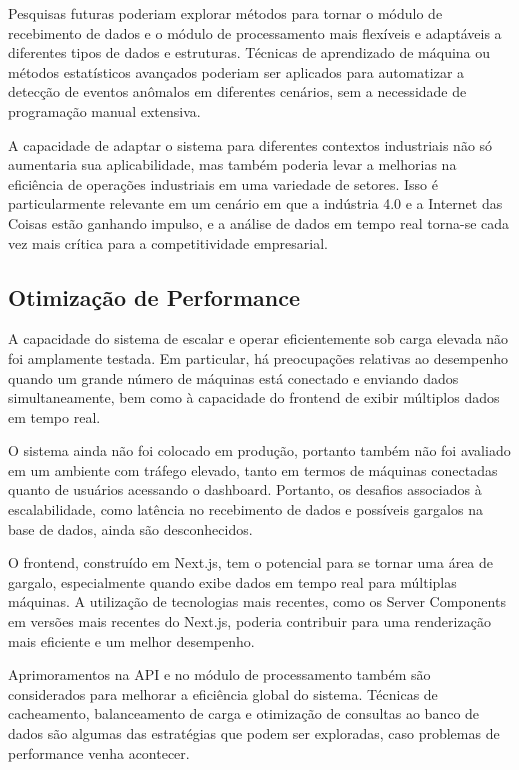 Pesquisas futuras poderiam explorar métodos para tornar o módulo de recebimento de dados e o módulo de processamento mais flexíveis e adaptáveis a diferentes tipos de dados e estruturas. Técnicas de aprendizado de máquina ou métodos estatísticos avançados poderiam ser aplicados para automatizar a detecção de eventos anômalos em diferentes cenários, sem a necessidade de programação manual extensiva.

A capacidade de adaptar o sistema para diferentes contextos industriais não só aumentaria sua aplicabilidade, mas também poderia levar a melhorias na eficiência de operações industriais em uma variedade de setores. Isso é particularmente relevante em um cenário em que a indústria 4.0 e a Internet das Coisas estão ganhando impulso, e a análise de dados em tempo real torna-se cada vez mais crítica para a competitividade empresarial.

\subsection{Otimização de Performance}

A capacidade do sistema de escalar e operar eficientemente sob carga elevada não foi amplamente testada. Em particular, há preocupações relativas ao desempenho quando um grande número de máquinas está conectado e enviando dados simultaneamente, bem como à capacidade do frontend de exibir múltiplos dados em tempo real.

O sistema ainda não foi colocado em produção, portanto também não foi avaliado em um ambiente com tráfego elevado, tanto em termos de máquinas conectadas quanto de usuários acessando o dashboard. Portanto, os desafios associados à escalabilidade, como latência no recebimento de dados e possíveis gargalos na base de dados, ainda são desconhecidos.

O frontend, construído em Next.js, tem o potencial para se tornar uma área de gargalo, especialmente quando exibe dados em tempo real para múltiplas máquinas. A utilização de tecnologias mais recentes, como os Server Components em versões mais recentes do Next.js, poderia contribuir para uma renderização mais eficiente e um melhor desempenho.

Aprimoramentos na \gls{API} e no módulo de processamento também são considerados para melhorar a eficiência global do sistema. Técnicas de cacheamento, balanceamento de carga e otimização de consultas ao banco de dados são algumas das estratégias que podem ser exploradas, caso problemas de performance venha acontecer.

